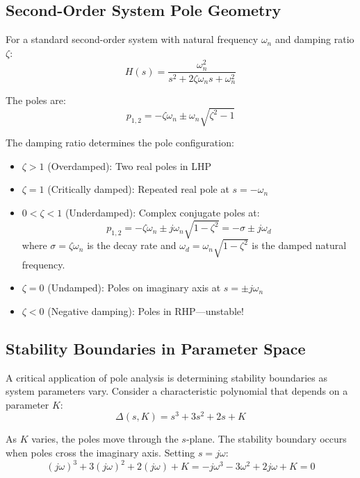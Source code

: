 \subsection{Second-Order System Pole Geometry}

For a standard second-order system with natural frequency $\omega_n$ and damping ratio $\zeta$:
\begin{equation}
H(s) = \frac{\omega_n^2}{s^2 + 2\zeta\omega_n s + \omega_n^2}
\end{equation}

The poles are:
\begin{equation}
p_{1,2} = -\zeta\omega_n \pm \omega_n\sqrt{\zeta^2 - 1}
\end{equation}

The damping ratio determines the pole configuration:

\begin{itemize}
    \item $\zeta > 1$ (Overdamped): Two real poles in LHP
    \item $\zeta = 1$ (Critically damped): Repeated real pole at $s = -\omega_n$
    \item $0 < \zeta < 1$ (Underdamped): Complex conjugate poles at:
    \begin{equation}
    p_{1,2} = -\zeta\omega_n \pm j\omega_n\sqrt{1-\zeta^2} = -\sigma \pm j\omega_d
    \end{equation}
    where $\sigma = \zeta\omega_n$ is the decay rate and $\omega_d = \omega_n\sqrt{1-\zeta^2}$ is the damped natural frequency.
    \item $\zeta = 0$ (Undamped): Poles on imaginary axis at $s = \pm j\omega_n$
    \item $\zeta < 0$ (Negative damping): Poles in RHP---unstable!
\end{itemize}

\subsection{Stability Boundaries in Parameter Space}

A critical application of pole analysis is determining stability boundaries as system parameters vary. Consider a characteristic polynomial that depends on a parameter $K$:
\begin{equation}
\Delta(s, K) = s^3 + 3s^2 + 2s + K
\end{equation}

As $K$ varies, the poles move through the $s$-plane. The stability boundary occurs when poles cross the imaginary axis. Setting $s = j\omega$:
\begin{equation}
(j\omega)^3 + 3(j\omega)^2 + 2(j\omega) + K = -j\omega^3 - 3\omega^2 + 2j\omega + K = 0
\end{equation}

